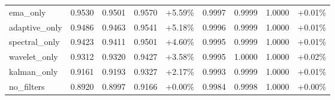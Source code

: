 \begin{table}[htbp]
\begin{adjustbox}{max width=\textwidth}
\begin{tabular}{l cccc cccc}
ema\_only & 0.9530 & 0.9501 & 0.9570 & +5.59\% & 0.9997 & 0.9999 & 1.0000 & +0.01\% \\
adaptive\_only & 0.9486 & 0.9463 & 0.9541 & +5.18\% & 0.9996 & 0.9999 & 1.0000 & +0.01\% \\
spectral\_only & 0.9423 & 0.9411 & 0.9501 & +4.60\% & 0.9995 & 0.9999 & 1.0000 & +0.01\% \\
wavelet\_only & 0.9312 & 0.9320 & 0.9427 & +3.58\% & 0.9995 & 1.0000 & 1.0000 & +0.02\% \\
kalman\_only & 0.9161 & 0.9193 & 0.9327 & +2.17\% & 0.9993 & 0.9999 & 1.0000 & +0.01\% \\
no\_filters & 0.8920 & 0.8997 & 0.9166 & +0.00\% & 0.9984 & 0.9998 & 1.0000 & +0.00\% \\
\bottomrule
\end{tabular}
\end{adjustbox}
\end{table}